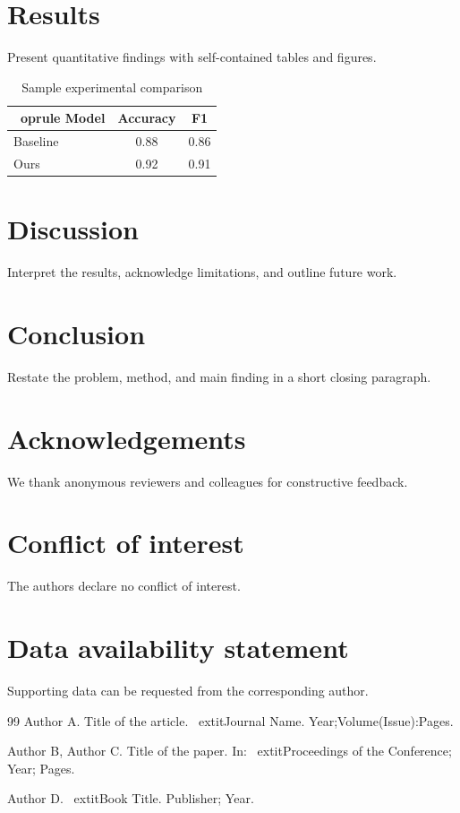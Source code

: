 \documentclass[11pt,a4paper]{article}
\begin{document}
\section{Results}
Present quantitative findings with self-contained tables and figures.

\begin{table}[htbp]
\centering
\caption{Sample experimental comparison}
\label{tab:wiley-sample}
\begin{tabular}{lcc}
\	oprule
Model & Accuracy & F1 \\
\midrule
Baseline & 0.88 & 0.86 \\
Ours & 0.92 & 0.91 \\
\bottomrule
\end{tabular}
\end{table}

\section{Discussion}
Interpret the results, acknowledge limitations, and outline future work.

\section{Conclusion}
Restate the problem, method, and main finding in a short closing paragraph.

\section*{Acknowledgements}
We thank anonymous reviewers and colleagues for constructive feedback.

\section*{Conflict of interest}
The authors declare no conflict of interest.

\section*{Data availability statement}
Supporting data can be requested from the corresponding author.

\begin{thebibliography}{99}
Author A. Title of the article. \	extit{Journal Name}. Year;Volume(Issue):Pages.

Author B, Author C. Title of the paper. In: \	extit{Proceedings of the Conference}; Year; Pages.

Author D. \	extit{Book Title}. Publisher; Year.
\end{thebibliography}
\end{document}
